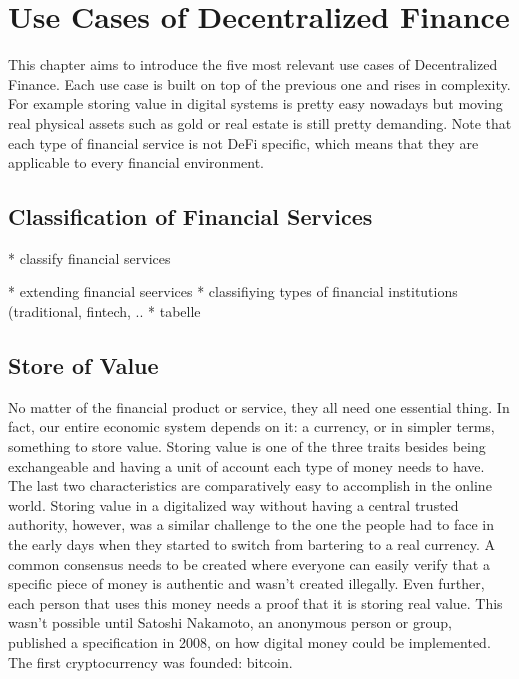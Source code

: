 \chapter{Use Cases of Decentralized Finance}
\label{cha:UseCasesDecentralizedFinance}

This chapter aims to introduce the five most relevant use cases of Decentralized Finance. Each use case is built on top of the previous one and rises in complexity. For example storing value in digital systems is pretty easy nowadays but moving real physical assets such as gold or real estate is still pretty demanding. Note that each type of financial service is not DeFi specific, which means that they are applicable to every financial environment.

\section{Classification of Financial Services}
* classify financial services

* extending financial seervices
* classifiying types of financial institutions (traditional, fintech, ..
* tabelle


\section{Store of Value}
No matter of the financial product or service, they all need one essential thing. In fact, our entire economic system depends on it: a currency, or in simpler terms, something to store value. Storing value is one of the three traits besides being exchangeable and having a unit of account each type of money needs to have. The last two characteristics are comparatively easy to accomplish in the online world. Storing value in a digitalized way without having a central trusted authority, however, was a similar challenge to the one the people had to face in the early days when they started to switch from bartering to a real currency. A common consensus needs to be created where everyone can easily verify that a specific piece of money is authentic and wasn't created illegally. Even further, each person that uses this money needs a proof that it is storing real value. This wasn't possible until Satoshi Nakamoto, an anonymous person or group, published a specification \cite{Nakamoto2008} in 2008, on how digital money could be implemented. The first cryptocurrency was founded: bitcoin.

